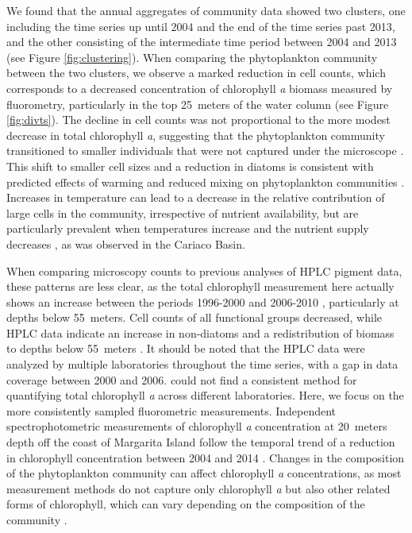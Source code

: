 \documentclass[draft]{agujournal2019}
\begin{document}
We found that the annual aggregates of community data showed two clusters, one including the time series up until 2004 and the end of the time series past 2013, and the other consisting of the intermediate time period between 2004 and 2013 (see Figure \ref{fig:clustering}).  
When comparing the phytoplankton community between the two clusters, we observe a marked reduction in cell counts, which corresponds to a decreased concentration of chlorophyll \textit{a} biomass measured by fluorometry, particularly in the top \qty{25}{meters} of the water column (see Figure \ref{fig:divts}). The decline in cell counts was not proportional to the more modest decrease in total chlorophyll \textit{a}, suggesting that the phytoplankton community transitioned to smaller individuals that were not captured under the microscope \cite{muller-karger_scientific_2019}. This shift to smaller cell sizes and a reduction in diatoms is consistent with predicted effects of warming and reduced mixing on phytoplankton communities \cite{bopp_response_2005}. Increases in temperature can lead to a decrease in the relative contribution of large cells in the community, irrespective of nutrient availability, but are particularly prevalent when temperatures increase and the nutrient supply decreases \cite{mousing_global_2014}, as was observed in the Cariaco Basin. 

When comparing microscopy counts to previous analyses of HPLC pigment data, these patterns are less clear, as the total chlorophyll measurement here actually shows an increase between the periods 1996-2000 and 2006-2010 \cite{pinckney_phytoplankton_2015}, particularly at depths below \qty{55}{meters}. Cell counts of all functional groups decreased, while HPLC data indicate an increase in non-diatoms and a redistribution of biomass to depths below \qty{55}{meters} \cite{pinckney_phytoplankton_2015}. It should be noted that the HPLC data were analyzed by multiple laboratories throughout the time series, with a gap in data coverage between 2000 and 2006.  could not find a consistent method for quantifying total chlorophyll \textit{a} across different laboratories. 
Here, we focus on the more consistently sampled fluorometric measurements. Independent spectrophotometric measurements of chlorophyll \textit{a} concentration at \qty{20}{meters} depth off the coast of Margarita Island follow the temporal trend of a reduction in chlorophyll concentration between 2004 and 2014 \cite{gomez_gaspar_variacion_2025}. Changes in the composition of the phytoplankton community can affect chlorophyll \textit{a} concentrations, as most measurement methods do not capture only chlorophyll \textit{a} but also other related forms of chlorophyll, which can vary depending on the composition of the community \cite{welschmeyer_fluorometric_1994}.
\end{document}
